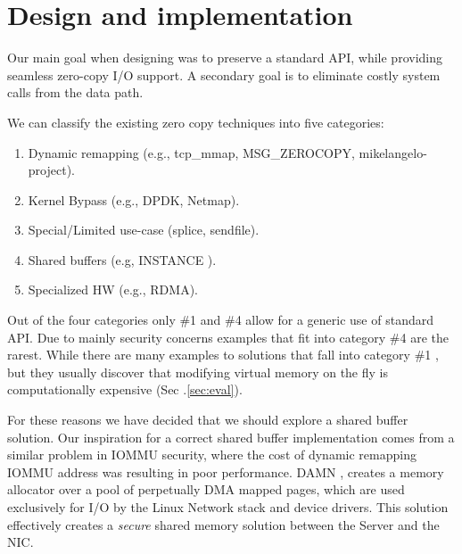 
\section{Design and implementation}\label{sec:design}
Our main goal when designing \oursys was to preserve a standard \sockets API, while providing seamless zero-copy I/O support. A secondary goal is to eliminate costly system calls from the data path. 

We can classify the existing zero copy techniques into five categories:
\begin{enumerate}
    \item Dynamic remapping (e.g., tcp\_mmap, MSG\_ZEROCOPY\cite{desendmsg}, mikelangelo-project\cite{mikelangelo}).
    \item Kernel Bypass (e.g., DPDK, Netmap\cite{rizzo2012netmap}).
    \item Special/Limited use-case (splice, sendfile).
    \item Shared buffers (e.g, INSTANCE \cite{instance}).
    \item Specialized HW (e.g., RDMA).
\end{enumerate}
Out of the four categories only \#1 and \#4 allow for a generic use of standard \sockets API. Due to mainly security concerns examples that fit into category \#4 are the rarest.
While there are many examples to solutions that fall into category \#1 \cite{mikelangelo-empty,desendmsg}, but they usually discover that modifying virtual memory on the fly is computationally expensive (Sec .\ref{sec:eval}). 

For these reasons we have decided that we should explore a shared buffer solution. Our inspiration for a correct shared buffer implementation comes from a similar problem in IOMMU security, where the cost of dynamic remapping IOMMU address was resulting in poor performance. DAMN \cite{markuze2018damn}, creates a memory allocator over a pool of perpetually DMA mapped pages, which are used exclusively for I/O by the Linux Network stack and device drivers. This solution effectively creates a \emph{secure} shared memory solution between the Server and the NIC.

